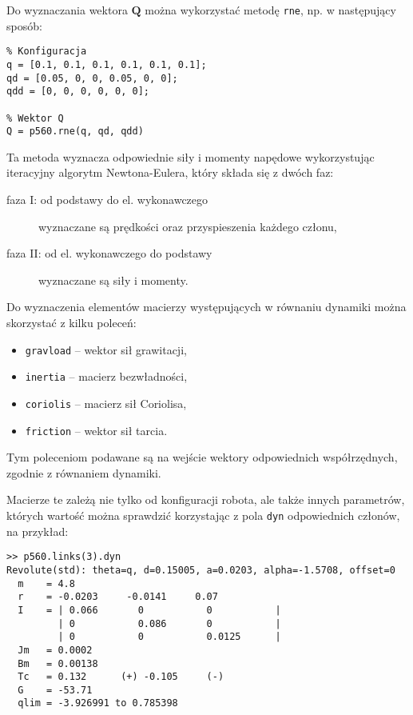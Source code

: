 \documentclass[11pt, a4paper]{article}
\begin{document}
Do wyznaczania wektora $\mathbf{Q}$ można wykorzystać metodę \texttt{rne}, np. w następujący sposób:
\begin{lstlisting}
% Konfiguracja
q = [0.1, 0.1, 0.1, 0.1, 0.1, 0.1];
qd = [0.05, 0, 0, 0.05, 0, 0];
qdd = [0, 0, 0, 0, 0, 0];

% Wektor Q
Q = p560.rne(q, qd, qdd)
\end{lstlisting}

Ta metoda wyznacza odpowiednie siły i momenty napędowe wykorzystując iteracyjny algorytm Newtona-Eulera, który składa się z dwóch faz:
\begin{description}
\item[faza I: od podstawy do el. wykonawczego] wyznaczane są prędkości oraz przyspieszenia każdego członu,
\item[faza II: od el. wykonawczego do podstawy] wyznaczane są siły i momenty.
\end{description}

Do wyznaczenia elementów macierzy występujących w równaniu dynamiki można skorzystać z kilku poleceń:
\begin{itemize}
\item \texttt{gravload} -- wektor sił grawitacji,
\item \texttt{inertia} -- macierz bezwładności,
\item \texttt{coriolis} -- macierz sił Coriolisa,
\item \texttt{friction} -- wektor sił tarcia.
\end{itemize}

Tym poleceniom podawane są na wejście wektory odpowiednich współrzędnych, zgodnie z równaniem dynamiki.

Macierze te zależą nie tylko od konfiguracji robota, ale także innych parametrów, których wartość można sprawdzić korzystając z pola \texttt{dyn} odpowiednich członów, na przykład:
\begin{lstlisting}[numbers = none]
>> p560.links(3).dyn
Revolute(std): theta=q, d=0.15005, a=0.0203, alpha=-1.5708, offset=0
  m    = 4.8        
  r    = -0.0203     -0.0141     0.07       
  I    = | 0.066       0           0           |
         | 0           0.086       0           |
         | 0           0           0.0125      |
  Jm   = 0.0002     
  Bm   = 0.00138    
  Tc   = 0.132      (+) -0.105     (-)
  G    = -53.71     
  qlim = -3.926991 to 0.785398
\end{lstlisting}
\end{document}
